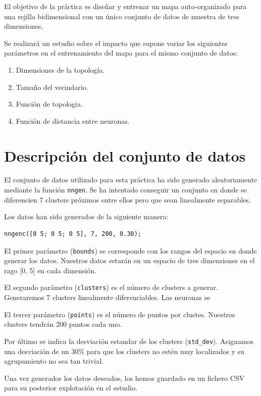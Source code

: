 \documentclass[a4paper,12pt,titlepage]{article}
\begin{document}
El objetivo de la práctica es diseñar y entrenar un mapa auto-organizado para una rejilla bidimensional con un único conjunto de datos de muestra de tres dimensiones. 

Se realizará un estudio sobre el impacto que supone variar los siguientes parámetros en el entrenamiento del mapa para el mismo conjunto de datos:

\begin{enumerate}[noitemsep]
	\item Dimensiones de la topología.
	\item Tamaño del vecindario.
	\item Función de topologia.
	\item Función de distancia entre neuronas.
\end{enumerate}

\section{Descripción del conjunto de datos}

El conjunto de datos utilizado para esta práctica ha sido generado aleatoriamente mediante la función \lstinline|nngen|. Se ha intentado conseguir un conjunto en donde se diferencien 7 clusters próximos entre ellos pero que sean linealmente separables.

Los datos han sido generados de la siguiente manera:

\begin{lstlisting}
nngenc([0 5; 0 5; 0 5], 7, 200, 0.30);
\end{lstlisting}

El primer parámetro (\lstinline|bounds|) se corresponde con los rangos del espacio en donde generar los datos. Nuestros datos estarán en un espacio de tres dimensiones en el rago [0, 5] en cada dimensión.

El segundo parámetro (\lstinline|clusters|) es el número de clusters a generar. Generaremos 7 clusters linealmente diferenciables. Las neuronas se 

El tercer parámetro (\lstinline|points|) es el número de puntos por clustes. Nuestros clusters tendrán 200 puntos cada uno.

Por último se indica la desviación estandar de los clusters (\lstinline|std_dev|). Asignamos una desviación de un 30\% para que los clusters no estén muy localizados y su agrupamiento no sea tan trivial.

Una vez generados los datos deseados, los hemos guardado en un fichero CSV para su posterior explotación en el estudio. 
\end{document}
